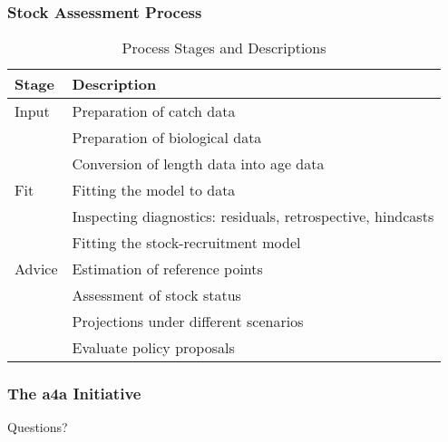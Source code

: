 \documentclass{beamer}
\begin{document}
\begin{frame}
\frametitle{Stock Assessment Process}

\begin{table}[h!]
	\centering
	\begin{tabular}{|l|l|}
		\hline
		\textbf{Stage} & \textbf{Description} \\
		\hline
		Input & Preparation of catch data \\
		& Preparation of biological data \\
		& Conversion of length data into age data \\
		\hline
		Fit   & Fitting the model to data \\
		& Inspecting diagnostics: residuals, retrospective, hindcasts \\
		& Fitting the stock-recruitment model \\
		\hline
		Advice & Estimation of reference points \\
		& Assessment of stock status \\
		& Projections under different scenarios \\
		& Evaluate policy proposals \\
		\hline
	\end{tabular}
	\caption{Process Stages and Descriptions}
\end{table}

\end{frame}

\begin{frame}
	\frametitle{The a4a Initiative}
	
	\centering Questions?
	
\end{frame}
\end{document}
